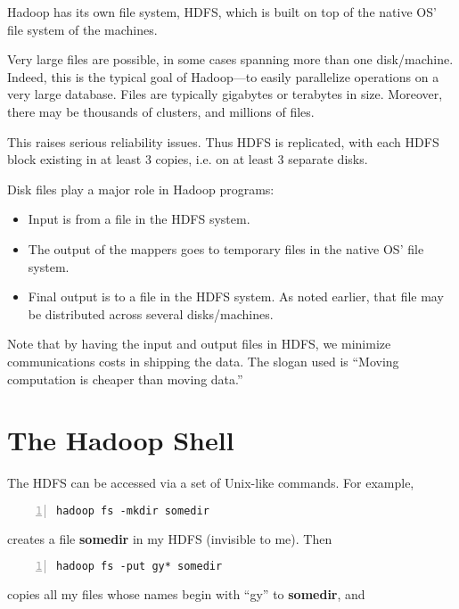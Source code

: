 Hadoop has its own file system, HDFS, which is built on top of the
native OS' file system of the machines.  


Very large files are possible, in some cases spanning more than one
disk/machine.  Indeed, this is the typical goal of Hadoop---to easily
parallelize operations on a very large database.  Files are typically
gigabytes or terabytes in size.  Moreover, there may be thousands of
clusters, and millions of files.

This raises serious reliability issues.  Thus HDFS is replicated, with
each HDFS block existing in at least 3 copies, i.e.  on at least 3
separate disks.  

Disk files play a major role in Hadoop programs:

\begin{itemize}

\item Input is from a file in the HDFS system.

\item The output of the mappers goes to temporary files in the native
OS' file system.

\item Final output is to a file in the HDFS system.  As noted earlier,
that file may be distributed across several disks/machines.

\end{itemize}

Note that by having the input and output files in HDFS, we minimize
communications costs in shipping the data.  The slogan used is ``Moving
computation is cheaper than moving data.''

\section{The Hadoop Shell}

The HDFS can be accessed via a set of Unix-like commands.  For example,

\begin{lstlisting}[numbers=left]
hadoop fs -mkdir somedir
\end{lstlisting}

creates a file {\bf somedir} in my HDFS (invisible to me).  Then

\begin{lstlisting}[numbers=left]
hadoop fs -put gy* somedir
\end{lstlisting}

copies all my files whose names begin with ``gy'' to {\bf somedir}, and

